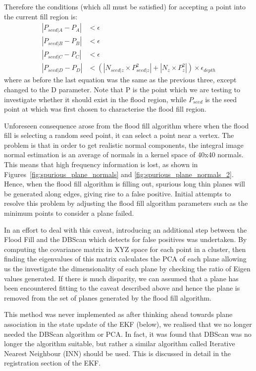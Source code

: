 \documentclass[]{article}
\begin{document}
{Therefore the conditions (which all must be satisfied) for accepting a point into the current fill region is:
\begin{align}
|P_{seed|A} - P_{A}| &< \epsilon \\
|P_{seed|B} - P_{B}| &< \epsilon\\
|P_{seed|C} - P_{C}| &< \epsilon\\
|P_{seed|D}-P_{D}| &< (|N_{seed|z} \times P^{2}_{seed|z}| + |N_{z} \times P^{2}_{z}|) \times \epsilon_{depth}
\end{align}
where as before the last equation was the same as the previous three, except changed to the D parameter.
Note that P is the point which we are testing to investigate whether it should exist in the flood region, while $P_{seed}$ is the seed point at which was first chosen to characterise the flood fill region. 

Unforeseen consequence arose from the flood fill algorithm where when the flood fill is selecting a random seed point, it can select a point near a vertex. The problem is that in order to get realistic normal components, the integral image normal estimation is an average of normals in a kernel space of 40x40 normals. This means that high frequency information is lost, as shown in Figures~\ref{fig:spurious_plane_normals} and \ref{fig:spurious_plane_normals_2}. Hence, when the flood fill algorithm is filling out, spurious long thin planes will be generated along edges, giving rise to a false positive. Initial attempts to resolve this problem by adjusting the flood fill algorithm parameters such as the minimum points to consider a plane failed.

In an effort to deal with this caveat, introducing an additional step between the Flood Fill and the DBScan which detects for false positives was undertaken. By computing the covariance matrix in XYZ space for each point in a cluster, then finding the eigenvalues of this matrix calculates the \ac{PCA} of each plane allowing us the investigate the dimensionality of each plane by checking the ratio of Eigen values generated. If there is much disparity, we can assumed that a plane has been encountered fitting to the caveat described above and hence the plane is removed from the set of planes generated by the flood fill algorithm. 

This method was never implemented as after thinking ahead towards plane association in the state update of the EKF (below), we realised that we no longer needed the DBScan algorithm or \ac{PCA}.  In fact, it was found that DBScan was no longer the algorithm suitable, but rather a similar algorithm called Iterative Nearest Neighbour (INN) should be used. This is discussed in detail in the registration section of the EKF.












}
\end{document}
